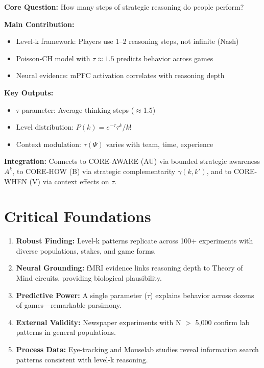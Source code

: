 \begin{tcolorbox}[colback=green!10!white, colframe=green!75!black,
    title=\textbf{Appendix RN: Summary}]

\textbf{Core Question:} How many steps of strategic reasoning do people perform?

\textbf{Main Contribution:}
\begin{itemize}[nosep]
    \item Level-k framework: Players use 1--2 reasoning steps, not infinite (Nash)
    \item Poisson-CH model with $\tau \approx 1.5$ predicts behavior across games
    \item Neural evidence: mPFC activation correlates with reasoning depth
\end{itemize}

\textbf{Key Outputs:}
\begin{itemize}[nosep]
    \item $\tau$ parameter: Average thinking steps ($\approx$1.5)
    \item Level distribution: $P(k) = e^{-\tau}\tau^k/k!$
    \item Context modulation: $\tau(\Psi)$ varies with team, time, experience
\end{itemize}

\textbf{Integration:} Connects to CORE-AWARE (AU) via bounded strategic awareness
$A^k$, to CORE-HOW (B) via strategic complementarity $\gamma(k,k')$, and to
CORE-WHEN (V) via context effects on $\tau$.

\end{tcolorbox}

\section{Critical Foundations}

\begin{enumerate}
    \item \textbf{Robust Finding:} Level-k patterns replicate across 100+ experiments with diverse populations, stakes, and game forms.

    \item \textbf{Neural Grounding:} fMRI evidence links reasoning depth to Theory of Mind circuits, providing biological plausibility.

    \item \textbf{Predictive Power:} A single parameter ($\tau$) explains behavior across dozens of games---remarkable parsimony.

    \item \textbf{External Validity:} Newspaper experiments with N $>$ 5,000 confirm lab patterns in general populations.

    \item \textbf{Process Data:} Eye-tracking and Mouselab studies reveal information search patterns consistent with level-k reasoning.
\end{enumerate}

